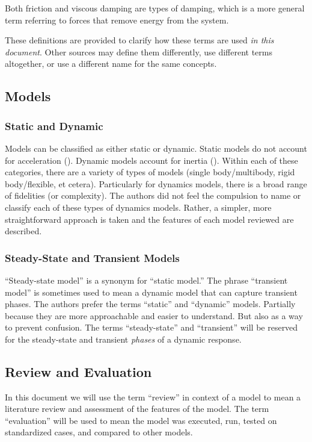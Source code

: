Both friction and viscous damping are types of damping, which is a more general term referring to forces that remove energy from the system.

These definitions are provided to clarify how these terms are used \emph{in this document}.  Other sources may define them differently, use different terms altogether, or use a different name for the same concepts.

\subsection{Models}
\subsubsection{Static and Dynamic}
Models can be classified as either static or dynamic.  Static models do not account for acceleration (\staticforcebalance{}).  Dynamic models account for inertia (\dynamicforcebalance{}).  Within each of these categories, there are a variety of types of models (single body/multibody, rigid body/flexible, et cetera).  Particularly for dynamics models, there is a broad range of fidelities (or complexity).  The authors did not feel the compulsion to name or classify each of these types of dynamics models.  Rather, a simpler, more straightforward approach is taken and the features of each model reviewed are described.

\subsubsection{Steady-State and Transient Models}
``Steady-state model'' is a synonym for ``static model.'' The phrase ``transient model'' is sometimes used to mean a dynamic model that can capture transient phases.  The authors prefer the terms ``static'' and ``dynamic'' models.  Partially because they are more approachable and easier to understand.  But also as a way to prevent confusion.  The terms ``steady-state'' and ``transient'' will be reserved for the steady-state and transient \emph{phases} of a dynamic response.

\subsection{Review and Evaluation}
In this document we will use the term ``review'' in context of a model to mean a literature review and assessment of the features of the model.  The term ``evaluation'' will be used to mean the model was executed, run, tested on standardized cases, and compared to other models.

